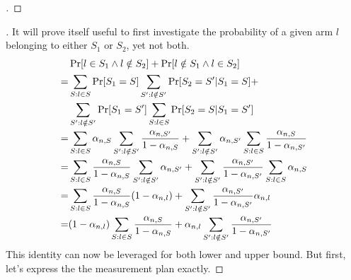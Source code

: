 \begin{proof}[]
\end{proof}

\begin{proof}[]
  It will prove itself useful to first investigate the probability of a given
  arm $l$ belonging to either $S_1$ or $S_2$, yet not both.
  \begin{align}
    &\Pr[l \in S_1 \wedge l \notin S_2] + \Pr[l \notin S_1 \wedge l \in S_2]  \\
    =& \sum_{S: l \in S} \Pr[S_1 = S] \sum_{S': l \notin S'} \Pr[S_2 = S' | S_1
        = S] + \notag\\
    & \sum_{S': l \notin S'} \Pr[S_1 = S'] \sum_{S: l \in S} \Pr[S_2 = S | S_1
        = S'] \\
    =& \sum_{S: l \in S} \alpha_{n, S} \sum_{S': l \notin S'} \frac{\alpha_{n,
        S'}}{1 - \alpha_{n, S}} + \sum_{S': l \notin S'} \alpha_{n, S'}
        \sum_{S: l \in S} \frac{\alpha_{n, S}}{1 - \alpha_{n, S'}}\\
    =& \sum_{S: l \in S} \frac{\alpha_{n, S}}{1 - \alpha_{n, S}} \sum_{S': l
        \notin S'} \alpha_{n, S'} + \sum_{S': l \notin S'} \frac{\alpha_{n,
        S'}}{1 - \alpha_{n, S'}} \sum_{S: l \in S} \alpha_{n, S}\\
    =& \sum_{S: l \in S} \frac{\alpha_{n, S}}{1 - \alpha_{n, S}} (1 -
        \alpha_{n, l}) +  \sum_{S': l \notin S'} \frac{\alpha_{n, S'}}{1 -
        \alpha_{n, S'}} \alpha_{n, l} \\
    =& (1 - \alpha_{n, l})\sum_{S: l \in S} \frac{\alpha_{n, S}}{1 - \alpha_{n,
        S}} + \alpha_{n, l} \sum_{S': l \notin S'} \frac{\alpha_{n, S'}}{1 -
        \alpha_{n, S'}}
  \end{align}
  This identity can now be leveraged for both lower and upper bound. But first,
  let's express the the measurement plan exactly.

\end{proof}
